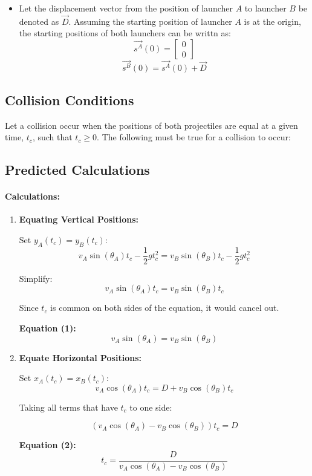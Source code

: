 \documentclass[12pt]{article}
\begin{document}
\begin{itemize}
\begin{itemize}
    \end{itemize}

    \item Let the displacement vector from the position of launcher $A$ to launcher $B$ be denoted as \(\vec{D}\). Assuming the starting position of launcher $A$ is at the origin, the starting positions of both launchers can be writtn as:
    \[
    \vec{s^A}(0) = \begin{bmatrix} 0 \\ 0 \end{bmatrix}
    \]
    \[
    \vec{s^B}(0) = \vec{s^A}(0) + \vec{D}
    \]
    
\end{itemize}

\subsection{Collision Conditions}
Let a collision occur when the positions of both projectiles are equal at a given time, \(t_c\), such that \(t_c \geq 0\). The following must be true for a collision to occur:


\subsection{Predicted Calculations}

\paragraph{Calculations:}
\begin{enumerate}
    \item \textbf{Equating Vertical Positions:} 
    
    Set \( y_A(t_c) = y_B(t_c) \):
    \[
    v_A \sin(\theta_A) t_c - \frac{1}{2} g t_c^2 = v_B \sin(\theta_B) t_c - \frac{1}{2} g t_c^2
    \]
    
    Simplify:
    \[
    v_A \sin(\theta_A) t_c = v_B \sin(\theta_B) t_c
    \]
    
    Since \( t_c \) is common on both sides of the equation, it would cancel out.
    
    \textbf{Equation (1):}
    \[
    v_A \sin(\theta_A) = v_B \sin(\theta_B)
    \]
    
    \item \textbf{Equate Horizontal Positions:} 
    
    Set \( x_A(t_c) = x_B(t_c) \):
    \[
    v_A \cos(\theta_A) t_c = D + v_B \cos(\theta_B) t_c
    \]
    
    Taking all terms that have \( t_c \) to one side:

    \[
    (v_A \cos(\theta_A) - v_B \cos(\theta_B)) t_c = D
    \]
    
    \textbf{Equation (2):}
    \[
    t_c = \frac{D}{v_A \cos(\theta_A) - v_B \cos(\theta_B)}
    \]
\end{enumerate}
\end{document}
